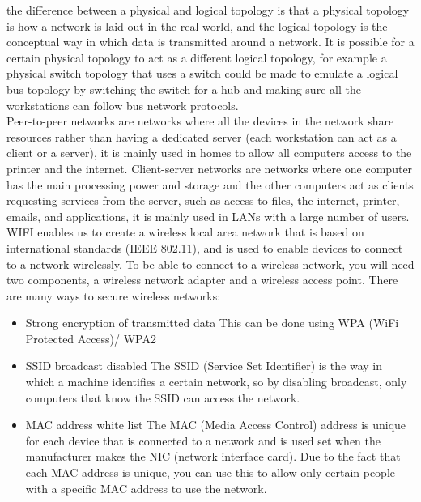   the difference between a physical and logical topology is that a physical topology is how a network is laid out in the real world, and the logical topology is the conceptual way in which data is transmitted around a network. It is possible for a certain physical topology to act as a different logical topology, for example a physical switch topology that uses a switch could be made to emulate a logical bus topology by switching the switch for a hub and making sure all the workstations can follow bus network protocols.\\
  Peer-to-peer networks are networks where all the devices in the network share resources rather than having a dedicated server (each workstation can act as a client or a server), it is mainly used in homes to allow all computers access to the printer and the internet. Client-server networks are networks where one computer has the main processing power and storage and the other computers act as clients requesting services from the server, such as access to files, the internet, printer, emails, and applications, it is mainly used in LANs with a large number of users.\\
  WIFI enables us to create a wireless local area network that is based on international standards (IEEE 802.11), and is used to enable devices to connect to a network wirelessly. To be able to connect to a wireless network, you will need two components, a wireless network adapter and a wireless access point. There are many ways to secure wireless networks:
  \begin{itemize}
    \item Strong encryption of transmitted data
      \subitem This can be done using WPA (WiFi Protected Access)/ WPA2
    \item SSID broadcast disabled
      \subitem The SSID (Service Set Identifier) is the way in which a machine identifies a certain network, so by disabling broadcast, only computers that know the SSID can access the network.
    \item MAC address white list
      \subitem The MAC (Media Access Control) address is unique for each device that is connected to a network and is used set when the manufacturer makes the NIC (network interface card). Due to the fact that each MAC address is unique, you can use this to allow only certain people with a specific MAC address to use the network.
  \end{itemize}

